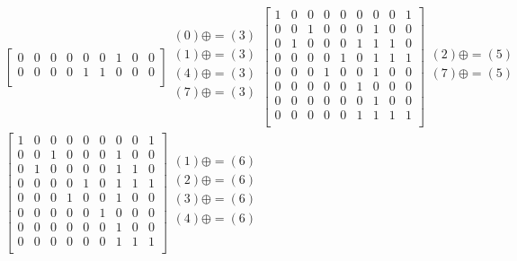 \documentclass[a4paper,10pt]{article} %
\begin{document}
\begin{multline}
\begin{bmatrix}
		0 & 0 & 0 & 0 & 0 & 0 & 1 & 0 & 0 \\
		0 & 0 & 0 & 0 & 1 & 1 & 0 & 0 & 0 \\
		\end{bmatrix}
		\begin{align}
		(0) \oplus= (3)\\
		(1) \oplus= (3)\\
		(4) \oplus= (3)\\
		(7) \oplus= (3)\\
		\end{align}
		\begin{bmatrix}
		1 & 0 & 0 & 0 & 0 & 0 & 0 & 0 & 1 \\
		0 & 0 & 1 & 0 & 0 & 0 & 1 & 0 & 0 \\
		0 & 1 & 0 & 0 & 0 & 1 & 1 & 1 & 0 \\
		0 & 0 & 0 & 0 & 1 & 0 & 1 & 1 & 1 \\
		0 & 0 & 0 & 1 & 0 & 0 & 1 & 0 & 0 \\
		0 & 0 & 0 & 0 & 0 & 1 & 0 & 0 & 0 \\
		0 & 0 & 0 & 0 & 0 & 0 & 1 & 0 & 0 \\
		0 & 0 & 0 & 0 & 0 & 1 & 1 & 1 & 1 \\
		\end{bmatrix}
		\begin{align}
		(2) \oplus= (5)\\
		(7) \oplus= (5)\\
		\end{align}\\
		\begin{bmatrix}
		1 & 0 & 0 & 0 & 0 & 0 & 0 & 0 & 1 \\
		0 & 0 & 1 & 0 & 0 & 0 & 1 & 0 & 0 \\
		0 & 1 & 0 & 0 & 0 & 0 & 1 & 1 & 0 \\
		0 & 0 & 0 & 0 & 1 & 0 & 1 & 1 & 1 \\
		0 & 0 & 0 & 1 & 0 & 0 & 1 & 0 & 0 \\
		0 & 0 & 0 & 0 & 0 & 1 & 0 & 0 & 0 \\
		0 & 0 & 0 & 0 & 0 & 0 & 1 & 0 & 0 \\
		0 & 0 & 0 & 0 & 0 & 0 & 1 & 1 & 1 \\
		\end{bmatrix}
		\begin{align}
		(1) \oplus= (6)\\
		(2) \oplus= (6)\\
		(3) \oplus= (6)\\
		(4) \oplus= (6)\\

\end{align}
\end{multline}
\end{document}
